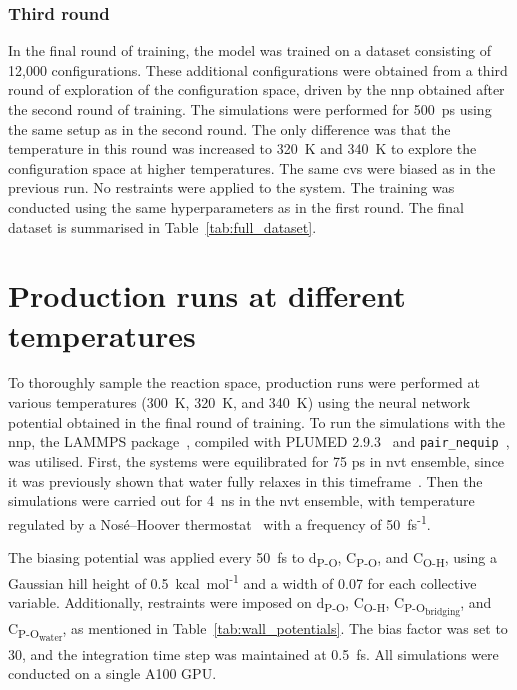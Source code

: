 \subsubsection{Third round}
In the final round of training, the model was trained on a dataset consisting of 12,000 configurations. These additional configurations were obtained from a third round of exploration of the configuration space, driven by the \ac{nnp} obtained after the second round of training. The simulations were performed for 500~ps using the same setup as in the second round. The only difference was that the temperature in this round was increased to 320~K and 340~K to explore the configuration space at higher temperatures. The same \acp{cv} were biased as in the previous run. No restraints were applied to the system. The training was conducted using the same hyperparameters as in the first round. The final dataset is summarised in Table~\ref{tab:full_dataset}.




\section{Production runs at different temperatures}
To thoroughly sample the reaction space, production runs were performed at various temperatures (300~K, 320~K, and 340~K) using the neural network potential obtained in the final round of training. To run the simulations with the \ac{nnp}, the LAMMPS package~\citep{thompsonLAMMPSFlexibleSimulation2022}, compiled with PLUMED 2.9.3~\citep{tribelloPLUMED2New2014} and \texttt{pair\_nequip}~\citep{MirgroupPair_nequip}, was utilised. First, the systems were equilibrated for 75 ps in \ac{nvt} ensemble, since it was previously shown that water fully relaxes in this timeframe~\citep{moronMacroNanoScale2016}. Then the simulations were carried out for 4~ns in the \ac{nvt} ensemble, with temperature regulated by a Nos\'e--Hoover thermostat~\citep{noseUnifiedFormulationConstant1984, hooverCanonicalDynamicsEquilibrium1985} with a frequency of 50~fs\textsuperscript{-1}.

The biasing potential was applied every 50~fs to d\textsubscript{P-O}, C\textsubscript{P-O}, and C\textsubscript{O-H}, using a Gaussian hill height of 0.5~kcal~mol\textsuperscript{-1} and a width of 0.07 for each collective variable. Additionally, restraints were imposed on d\textsubscript{P-O}, C\textsubscript{O-H}, C\textsubscript{P-O\textsubscript{bridging}}, and C\textsubscript{P-O\textsubscript{water}}, as mentioned in Table~\ref{tab:wall_potentials}. The bias factor was set to 30, and the integration time step was maintained at 0.5~fs. All simulations were conducted on a single A100 GPU.

